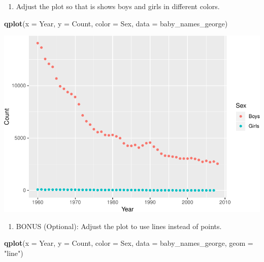 \documentclass[]{book}
\newenvironment{Shaded}{\begin{snugshade}}{\end{snugshade}}
\newcommand{\KeywordTok}[1]{\textcolor[rgb]{0.13,0.29,0.53}{\textbf{#1}}}
\newcommand{\DataTypeTok}[1]{\textcolor[rgb]{0.13,0.29,0.53}{#1}}
\newcommand{\StringTok}[1]{\textcolor[rgb]{0.31,0.60,0.02}{#1}}
\newcommand{\NormalTok}[1]{#1}
\providecommand{\tightlist}{%
  \setlength{\itemsep}{0pt}\setlength{\parskip}{0pt}}
\begin{document}
\begin{enumerate}
\def\labelenumi{\arabic{enumi}.}
\setcounter{enumi}{2}
\tightlist
\item
  Adjust the plot so that is shows boys and girls in different colors.
\end{enumerate}

\begin{Shaded}
\begin{Highlighting}[]
\KeywordTok{qplot}\NormalTok{(}\DataTypeTok{x =}\NormalTok{ Year, }\DataTypeTok{y =}\NormalTok{ Count, }\DataTypeTok{color =}\NormalTok{ Sex, }\DataTypeTok{data =}\NormalTok{ baby_names_george)}
\end{Highlighting}
\end{Shaded}

\includegraphics{R/Rintro/figures/unnamed-chunk-70-1.pdf}

\begin{enumerate}
\def\labelenumi{\arabic{enumi}.}
\setcounter{enumi}{3}
\tightlist
\item
  BONUS (Optional): Adjust the plot to use lines instead of points.
\end{enumerate}

\begin{Shaded}
\begin{Highlighting}[]
\KeywordTok{qplot}\NormalTok{(}\DataTypeTok{x =}\NormalTok{ Year, }\DataTypeTok{y =}\NormalTok{ Count, }\DataTypeTok{color =}\NormalTok{ Sex, }\DataTypeTok{data =}\NormalTok{ baby_names_george, }\DataTypeTok{geom =} \StringTok{"line"}\NormalTok{)}
\end{Highlighting}
\end{Shaded}
\end{document}
